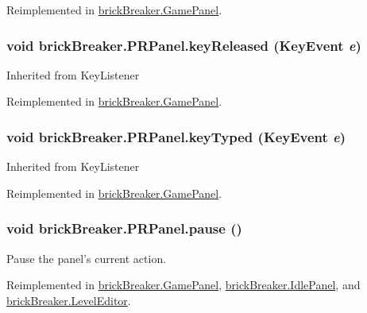 Reimplemented in \hyperlink{classbrick_breaker_1_1_game_panel_abf3d766d8fff87e69bfaf8ff59c438f3}{brickBreaker.GamePanel}.

\hypertarget{classbrick_breaker_1_1_p_r_panel_a3485136bec68dd500b98039bd7a87e8e}{
\subsubsection[{keyReleased}]{\setlength{\rightskip}{0pt plus 5cm}void brickBreaker.PRPanel.keyReleased (KeyEvent {\em e})}}
\label{classbrick_breaker_1_1_p_r_panel_a3485136bec68dd500b98039bd7a87e8e}
Inherited from KeyListener 

Reimplemented in \hyperlink{classbrick_breaker_1_1_game_panel_a8c41cc926e88dc8d1a1c241e6b9ef12e}{brickBreaker.GamePanel}.

\hypertarget{classbrick_breaker_1_1_p_r_panel_a51bdf51ab7141c16101753e4180c970a}{
\subsubsection[{keyTyped}]{\setlength{\rightskip}{0pt plus 5cm}void brickBreaker.PRPanel.keyTyped (KeyEvent {\em e})}}
\label{classbrick_breaker_1_1_p_r_panel_a51bdf51ab7141c16101753e4180c970a}
Inherited from KeyListener 

Reimplemented in \hyperlink{classbrick_breaker_1_1_game_panel_a23a455353c5904274a39f0f224cb0005}{brickBreaker.GamePanel}.

\hypertarget{classbrick_breaker_1_1_p_r_panel_a0868e501fc5599973492e6f0c53da920}{
\subsubsection[{pause}]{\setlength{\rightskip}{0pt plus 5cm}void brickBreaker.PRPanel.pause ()}}
\label{classbrick_breaker_1_1_p_r_panel_a0868e501fc5599973492e6f0c53da920}
Pause the panel's current action. 

Reimplemented in \hyperlink{classbrick_breaker_1_1_game_panel_a74382da15296d8ed9be081e4e6af72cc}{brickBreaker.GamePanel}, \hyperlink{classbrick_breaker_1_1_idle_panel_a42b96627662408932245a672b5fbfaf1}{brickBreaker.IdlePanel}, and \hyperlink{classbrick_breaker_1_1_level_editor_a5c1da01da393e14dbd38039bc457f713}{brickBreaker.LevelEditor}.

